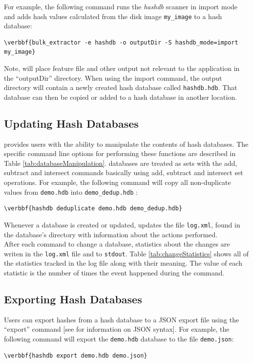 \documentclass[11pt,fleqn]{article} %
\begin{document}
For example, the following command runs the \bulk \textit{hashdb} scanner in import mode and adds hash values calculated from the disk image \texttt{my\_image} to a hash database:
\begin{Verbatim}[commandchars=\\\{\}]
\verbbf{bulk_extractor -e hashdb -o outputDir -S hashdb_mode=import my_image}
\end{Verbatim}
Note, \bulk will place feature file and other output not relevant to the \hdb application in the ``outputDir'' directory. When using the import command, the output directory will contain a newly created hash database called \texttt{hashdb.hdb}. That database can then be copied or added to a hash database in another location.


\subsection{Updating Hash Databases}
\label{updateSection}
\hdb provides users with the ability to manipulate the contents of hash databases. The specific command line options for performing these functions are described in Table \ref{tab:databaseManipulation}. \hdb databases are treated as sets with the add, subtract and intersect commands basically using add, subtract and intersect set operations. For example, the following command will  copy all non-duplicate values from \texttt{demo.hdb} into \texttt{demo\_dedup.hdb} :
\begin{Verbatim}[commandchars=\\\{\}]
\verbbf{hashdb deduplicate demo.hdb demo_dedup.hdb}
\end{Verbatim}
Whenever a database is created or updated, \hdb updates the file \texttt{log.xml}, found in the database's directory with information about the actions performed.\\

After each command to change a database, statistics about the changes are writen in the \texttt{log.xml} file and to \texttt{stdout}. Table \ref{tab:changeStatistics} shows all of the statistics tracked in the log file along with their meaning. The value of each statistic is the number of times the event happened during the command.\\


\subsection{Exporting Hash Databases}
Users can export hashes from a hash database to a JSON export file using the ``export'' command [see \textbf{} for information on JSON syntax].  For example, the following command will export the \texttt{demo.hdb} database to the file \texttt{demo.json}:
\begin{Verbatim}[commandchars=\\\{\}]
\verbbf{hashdb export demo.hdb demo.json}
\end{Verbatim}
\end{document}
